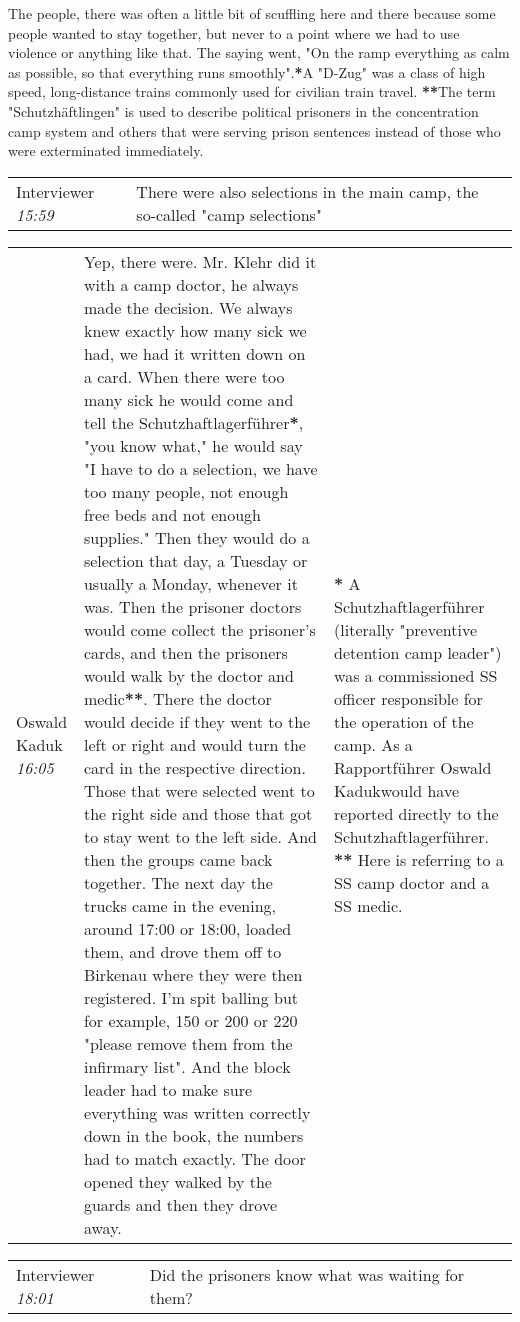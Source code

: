 \documentclass{article}
\newcommand{\I}{Interviewer}
\newcommand{\OK}{Oswald Kaduk}
\newcommand{\dialogueentry}[4]{
    \begin{center}
    \begin{tabular}{p{1in} p{3.5in} p{1.5in}} 
        #2 \newline \textit{#1} & #3 & \small{#4} 
    \end{tabular}
    \end{center}
}
\newcommand{\seenote}[1]{\textbf{#1}}
\newcommand{\onelinebreak}{\newline}
\newcommand{\twolinebreak}{\newline \newline}
\begin{document}
{\twolinebreak
The people, there was often a little bit of scuffling here and there because some people wanted to stay together, but never to a point where we had to use violence or anything like that. The saying went, "On the ramp everything as calm as possible, so that everything runs smoothly".}{\seenote{*}A "D-Zug" was a class of high speed, long-distance trains commonly used for civilian train travel. 
\onelinebreak
\seenote{**}The term "Schutzhäftlingen" is used to describe political prisoners in the concentration camp system and others that were serving prison sentences instead of those who were exterminated immediately.}

\dialogueentry{15:59}{\I}{There were also selections in the main camp, the so-called "camp selections"}{}

\dialogueentry{16:05}{\OK}{Yep, there were. Mr. Klehr did it with a camp doctor, he always made the decision. We always knew exactly how many sick we had, we had it written down on a card. When there were too many sick he would come and tell the Schutzhaftlagerführer\seenote{*}, "you know what," he would say "I have to do a selection, we have too many people, not enough free beds and not enough supplies." Then they would do a selection that day, a Tuesday or usually a Monday, whenever it was. 
\twolinebreak
Then the prisoner doctors would come collect the prisoner's cards, and then the prisoners would walk by the doctor and medic\seenote{**}. There the doctor would decide if they went to the left or right and would turn the card in the respective direction. Those that were selected went to the right side and those that got to stay went to the left side. And then the groups came back together. The next day the trucks came in the evening, around 17:00 or 18:00, loaded them, and drove them off to Birkenau where they were then registered. 
\twolinebreak
I'm spit balling but for example, 150 or 200 or 220 "please remove them from the infirmary list". And the block leader had to make sure everything was written correctly down in the book, the numbers had to match exactly. The door opened they walked by the guards and then they drove away.}{\seenote{*} A Schutzhaftlagerführer (literally "preventive detention camp leader") was a commissioned SS officer responsible for the operation of the camp. As a Rapportführer \OK would have reported directly to the Schutzhaftlagerführer.
\onelinebreak
\seenote{**} Here is referring to a SS camp doctor and a SS medic.
}

\dialogueentry{18:01}{\I}{Did the prisoners know what was waiting for them?}{}
\end{document}
